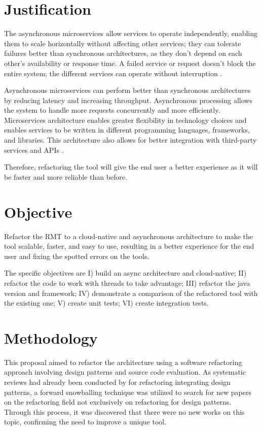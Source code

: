 \section{Justification}
The asynchronous microservices allow services to operate independently, enabling them to scale horizontally without affecting other services; they can tolerate failures better than synchronous architectures, as they don't depend on each other's availability or response time. A failed service or request doesn't block the entire system; the different services can operate without interruption \cite{microservices-comuni}.

Asynchronous microservices can perform better than synchronous architectures by reducing latency and increasing throughput. Asynchronous processing allows the system to handle more requests concurrently and more efficiently. Microservices architecture enables greater flexibility in technology choices and enables services to be written in different programming languages, frameworks, and libraries. This architecture also allows for better integration with third-party services and APIs \cite{larrucea2018}.

Therefore, refactoring the tool will give the end user a better experience as it will be faster and more reliable than before.

\section{Objective}
Refactor the RMT to a cloud-native and asynchronous architecture to make the tool scalable, faster, and easy to use, resulting in a better experience for the end user and fixing the spotted errors on the tools.

The specific objectives are I) build an async architecture and cloud-native; II) refactor the code to work with threads to take advantage; III) refactor the java version and framework; IV) demonstrate a comparison of the refactored tool with the existing one; V) create unit tests; VI) create integration tests.

\section{Methodology}
This proposal aimed to refactor the architecture using a software refactoring approach involving design patterns and source code evaluation. As systematic reviews had already been conducted by \textcite{beluzzo2018abordagem} for refactoring integrating design patterns, a forward snowballing technique was utilized to search for new papers on the refactoring field not exclusively on refactoring for design patterns. Through this process, it was discovered that there were no new works on this topic, confirming the need to improve a unique tool.

